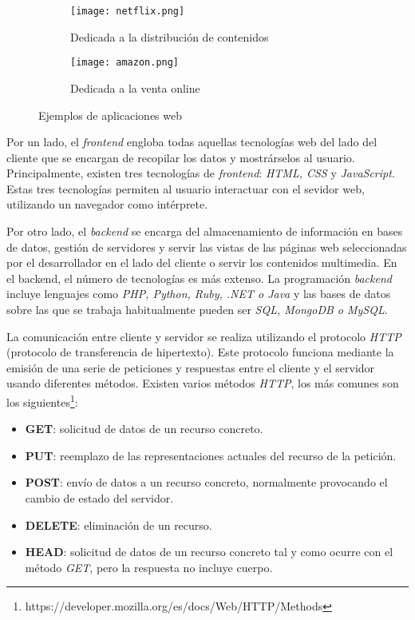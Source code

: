 \begin{figure}[!h]
  \begin{subfigure}[b]{0.5\textwidth}
    \texttt{[image: netflix.png]}
    \caption{Dedicada a la distribución de contenidos}
  \end{subfigure}
        \hfill
  \begin{subfigure}[b]{0.5\textwidth}
    \texttt{[image: amazon.png]}
    \caption{Dedicada a la venta online}
  \end{subfigure}
\caption{Ejemplos de aplicaciones web}
\label{fig:ejemplosaplicaciones}
\end{figure}

Por un lado, el \textit{frontend} engloba todas aquellas tecnologías web del lado del cliente que se encargan de recopilar los datos y mostrárselos al usuario. Principalmente, existen tres tecnologías de \textit{frontend}: \textit{HTML, CSS} y \textit{JavaScript}. Estas tres tecnologías permiten al usuario interactuar con el sevidor web, utilizando un navegador como intérprete. \newline 

Por otro lado, el \textit{backend} se encarga del almacenamiento de información en bases de datos, gestión de servidores y servir las vistas de las páginas web seleccionadas por el desarrollador en el lado del cliente o servir los contenidos multimedia. En el backend, el número de tecnologías es más extenso. La programación \textit{backend} incluye lenguajes como \textit{PHP, Python, Ruby, .NET o Java }y las bases de datos sobre las que se trabaja habitualmente pueden ser \textit{SQL, MongoDB o MySQL}. \newline 

La comunicación entre cliente y servidor se realiza utilizando el protocolo \textit{HTTP} (protocolo de transferencia de hipertexto). Este protocolo funciona mediante la emisión de una serie de peticiones y respuestas entre el cliente y el servidor usando diferentes métodos. Existen varios métodos \textit{HTTP}, los más comunes son los siguientes\footnote{https://developer.mozilla.org/es/docs/Web/HTTP/Methods}:

\begin{itemize}
    \item \textbf{GET}: solicitud de datos de un recurso concreto.
    \item \textbf{PUT}: reemplazo de las representaciones actuales del recurso de la petición.
    \item \textbf{POST}: envío de datos a un recurso concreto, normalmente provocando el cambio de estado del servidor.
    \item \textbf{DELETE}: eliminación de un recurso.
     \item \textbf{HEAD}: solicitud de datos de un recurso concreto tal y como ocurre con el método \textit{GET}, pero la respuesta no incluye cuerpo.
\end{itemize}

